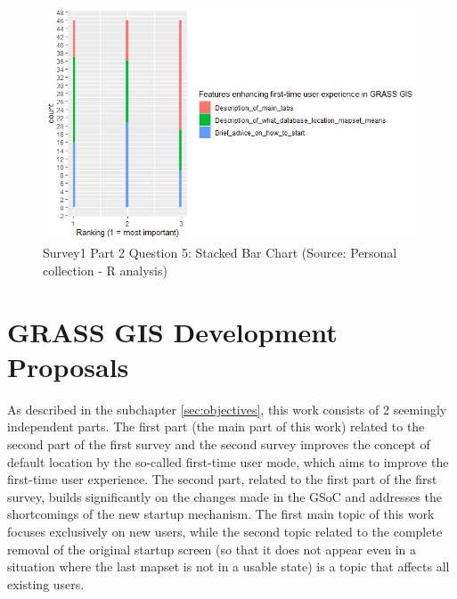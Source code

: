 \documentclass[a4paper,10pt,twoside]{article}
\begin{document}
\vspace{0.3cm}
\begin{figure}[hbt!] 
\begin{center}
\includegraphics[width=15cm]{../surveys/analyzed_data/survey1_part2_question5_histogram_r.png} 
\caption[Survey1 Part 2 Question 5: Stacked Bar Chart]{Survey1 Part 2 Question 5: Stacked Bar Chart (Source: Personal collection - R analysis)}
\label{fig:survey1_part2_question5_histogram_r}
\end{center}
\end{figure}

\newpage
\vspace*{-1cm}
\section{GRASS GIS Development Proposals}
\label{sec:proposal}

\noindent As described in the subchapter \ref{sec:objectives}, this work consists of 2 seemingly independent parts. The first part (the main part of this work) related to the second part of the first survey and the second survey improves the concept of default location by the so-called first-time user mode, which aims to improve the first-time user experience. The second part, related to the first part of the first survey, builds significantly on the changes made in the GSoC and addresses the shortcomings of the new startup mechanism. The first main topic of this work focuses exclusively on new users, while the second topic related to the complete removal of the original startup screen (so that it does not appear even in a situation where the last mapset is not in a usable state) is a topic that affects all existing users.
\end{document}
